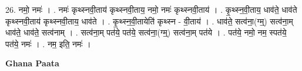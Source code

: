 \documentclass[17pt]{extarticle}
\begin{document}
26. नमो॒ नमः॑ । . नमः॑ कृथ्स्नवी॒ताय॑ कृथ्स्नवी॒ताय॒ नमो॒ नमः॑ कृथ्स्नवी॒ताय॑ । . कृ॒थ्स्न॒वी॒ताय॒ धाव॑ते॒ धाव॑ते कृथ्स्नवी॒ताय॑ कृथ्स्नवी॒ताय॒ धाव॑ते । . कृ॒थ्स्न॒वी॒तायेति॑ कृथ्स्न - वी॒ताय॑ । . धाव॑ते॒ सत्व॑ना॒(ग्म्॒) सत्व॑ना॒म् धाव॑ते॒ धाव॑ते॒ सत्व॑नाम् । . सत्व॑ना॒म् पत॑ये॒ पत॑ये॒ सत्व॑ना॒(ग्म्॒) सत्व॑ना॒म् पत॑ये । . पत॑ये॒ नमो॒ नम॒ स्पत॑ये॒ पत॑ये॒ नमः॑ । . नम॒ इति॒ नमः॑ । \newline

\textbf{Ghana Paata } \newline
\end{document}
